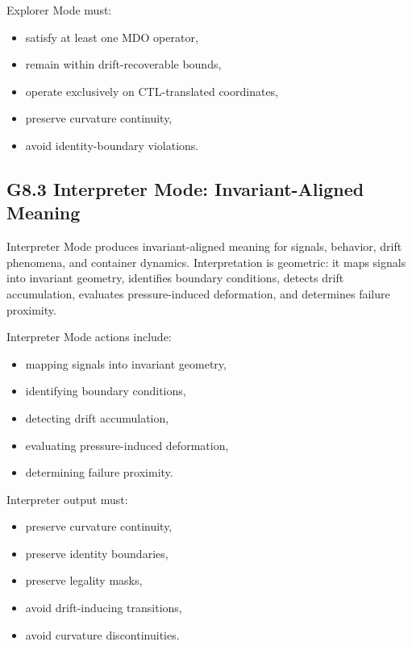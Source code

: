 \medskip

\noindent Explorer Mode must:

\begin{itemize}[leftmargin=1.2cm]
    \item satisfy at least one MDO operator,
    \item remain within drift-recoverable bounds,
    \item operate exclusively on CTL-translated coordinates,
    \item preserve curvature continuity,
    \item avoid identity-boundary violations.
\end{itemize}

\medskip

\subsection*{G8.3 Interpreter Mode: Invariant-Aligned Meaning}

\noindent Interpreter Mode produces invariant-aligned meaning for signals,
behavior, drift phenomena, and container dynamics. Interpretation is geometric:
it maps signals into invariant geometry, identifies boundary conditions, detects
drift accumulation, evaluates pressure-induced deformation, and determines
failure proximity.

\medskip

\noindent Interpreter Mode actions include:

\begin{itemize}[leftmargin=1.2cm]
    \item mapping signals into invariant geometry,
    \item identifying boundary conditions,
    \item detecting drift accumulation,
    \item evaluating pressure-induced deformation,
    \item determining failure proximity.
\end{itemize}

\medskip

\noindent Interpreter output must:

\begin{itemize}[leftmargin=1.2cm]
    \item preserve curvature continuity,
    \item preserve identity boundaries,
    \item preserve legality masks,
    \item avoid drift-inducing transitions,
    \item avoid curvature discontinuities.
\end{itemize}

